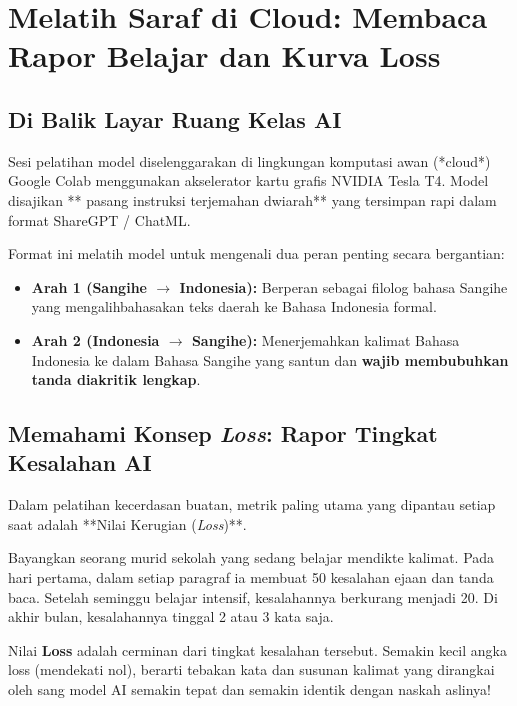 \chapter{Melatih Saraf di Cloud: Membaca Rapor Belajar dan Kurva Loss}

\section{Di Balik Layar Ruang Kelas AI}
Sesi pelatihan model diselenggarakan di lingkungan komputasi awan (*cloud*) Google Colab menggunakan akselerator kartu grafis NVIDIA Tesla T4. Model disajikan **\StatTrainPairs{} pasang instruksi terjemahan dwiarah** yang tersimpan rapi dalam format ShareGPT / ChatML.

Format ini melatih model untuk mengenali dua peran penting secara bergantian:
\begin{itemize}
    \item \textbf{Arah 1 (Sangihe $\rightarrow$ Indonesia):} Berperan sebagai filolog bahasa Sangihe yang mengalihbahasakan teks daerah ke Bahasa Indonesia formal.
    \item \textbf{Arah 2 (Indonesia $\rightarrow$ Sangihe):} Menerjemahkan kalimat Bahasa Indonesia ke dalam Bahasa Sangihe yang santun dan \textbf{wajib membubuhkan tanda diakritik lengkap}.
\end{itemize}

\section{Memahami Konsep \textit{Loss}: Rapor Tingkat Kesalahan AI}
Dalam pelatihan kecerdasan buatan, metrik paling utama yang dipantau setiap saat adalah **Nilai Kerugian (\textit{Loss})**.

\begin{infobox}
Bayangkan seorang murid sekolah yang sedang belajar mendikte kalimat. Pada hari pertama, dalam setiap paragraf ia membuat 50 kesalahan ejaan dan tanda baca. Setelah seminggu belajar intensif, kesalahannya berkurang menjadi 20. Di akhir bulan, kesalahannya tinggal 2 atau 3 kata saja.

Nilai \textbf{Loss} adalah cerminan dari tingkat kesalahan tersebut. Semakin kecil angka loss (mendekati nol), berarti tebakan kata dan susunan kalimat yang dirangkai oleh sang model AI semakin tepat dan semakin identik dengan naskah aslinya!
\end{infobox}

